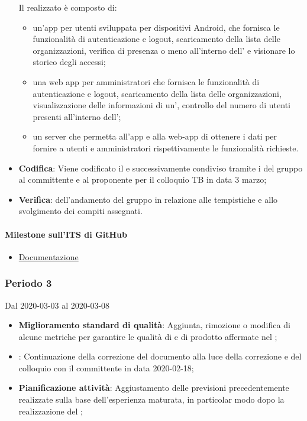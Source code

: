 \begin{itemize}
	Il  realizzato è composto di:
	\begin{itemize}
		\item un'app per utenti sviluppata per dispositivi Android, che fornisca le funzionalità di autenticazione e logout, scaricamento della lista delle organizzazioni, verifica di presenza o meno all'interno dell' e visionare lo storico degli accessi;
		\item una web app per amministratori che fornisca le funzionalità di autenticazione e logout, scaricamento della lista delle organizzazioni, visualizzazione delle informazioni di un', controllo del numero di utenti presenti all'interno dell';
		\item un server che permetta all'app e alla web-app di ottenere i dati per fornire a utenti e amministratori rispettivamente le funzionalità richieste.
	\end{itemize}
	\item \textbf{Codifica}: Viene codificato il  e successivamente condiviso tramite i  del gruppo al committente e al proponente per il colloquio TB in data 3 marzo;
	\item \textbf{Verifica}:  dell'andamento del gruppo in relazione alle tempistiche e allo svolgimento dei compiti assegnati.
\end{itemize}
\paragraph{Milestone sull'ITS di GitHub}
\begin{itemize}
	\item \href{https://github.com/qb-team/Stalker-Documentazione/milestone/9}{Documentazione}
\end{itemize}

\subsubsection{Periodo 3} 
Dal 2020-03-03 al 2020-03-08
\begin{itemize}
	\item \textbf{Miglioramento standard di qualità}: Aggiunta, rimozione o modifica di alcune metriche per garantire le qualità di  e di prodotto affermate nel \PdQ{};
	\item \textbf{\AdR{}}: Continuazione della correzione del documento alla luce della correzione e del colloquio con il committente in data 2020-02-18;
	\item \textbf{Pianificazione attività}: Aggiustamento delle previsioni precedentemente realizzate sulla base dell'esperienza maturata, in particolar modo dopo la realizzazione del ;
\end{itemize}
